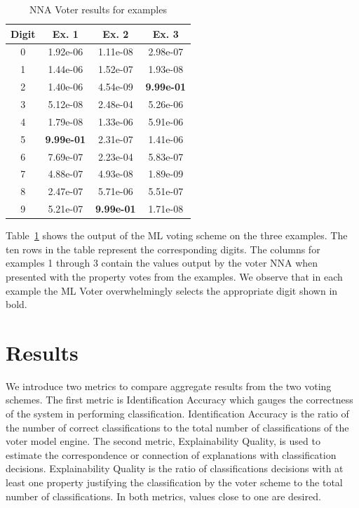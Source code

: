 \documentclass[conference]{IEEEtran}
\begin{document}
\begin{table}[htbp]
\caption{NNA Voter results for examples}
\centering
\begin{tabular}{| c | c | c | c |}
\hline
 Digit & Ex. 1 & Ex. 2 & Ex. 3 \\
\hline\hline
0 & 1.92e-06 & 1.11e-08 & 2.98e-07\\ 
\hline
1 & 1.44e-06 & 1.52e-07 & 1.93e-08 \\
\hline
2 & 1.40e-06 & 4.54e-09 & \textbf{9.99e-01} \\
\hline
3 & 5.12e-08 & 2.48e-04 & 5.26e-06 \\
\hline
4 & 1.79e-08 & 1.33e-06 & 5.91e-06 \\
\hline
5 & \textbf{9.99e-01} & 2.31e-07 & 1.41e-06 \\
\hline
6 & 7.69e-07 & 2.23e-04 & 5.83e-07 \\
\hline
7 & 4.88e-07 & 4.93e-08 & 1.89e-09 \\
\hline
8 & 2.47e-07 & 5.71e-06 & 5.51e-07 \\
\hline
9 & 5.21e-07 & \textbf{9.99e-01} & 1.71e-08 \\
\hline
\end{tabular}
\label{table:nnavoter}
\end{table}

Table~\ref{table:nnavoter} shows the output of the ML voting scheme on the three examples.  The ten rows in the table represent the corresponding digits.  The columns for examples 1 through 3 contain the values output by the voter NNA when presented with the property votes from the examples.  We observe that in each example the ML Voter overwhelmingly selects the appropriate digit shown in bold.

\section{Results}

We introduce two metrics to compare aggregate results from the two voting schemes.  The first metric is Identification Accuracy which gauges the correctness of the system in performing classification.  Identification Accuracy is the ratio of the number of correct classifications to the total number of classifications of the voter model engine.  The second metric, Explainability Quality, is used to estimate the correspondence or connection of explanations with classification decisions.  Explainability Quality is the ratio of classifications decisions with at least one property justifying the classification by the voter scheme to the total number of classifications.   In both metrics, values close to one are desired.
\end{document}
